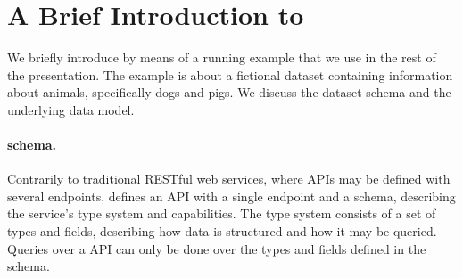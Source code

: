 \section{A Brief Introduction to \gql}\label{sec:bg}


We briefly introduce \gql by means of a running example that we use in
the rest of the presentation.  The example is about a fictional
dataset \goodbois containing information about animals, specifically
dogs and pigs. We discuss the dataset schema and the underlying data
model.




\paragraph{\gql schema.}

Contrarily to traditional RESTful web services, where APIs may be defined with several endpoints, 
\gql defines an API with a single endpoint and a schema, describing the service's type system and capabilities.
The type system consists of a set of types and fields, describing how data is structured and how it may be queried.
Queries over a \gql API can only be done over
the types and fields defined in the schema.

